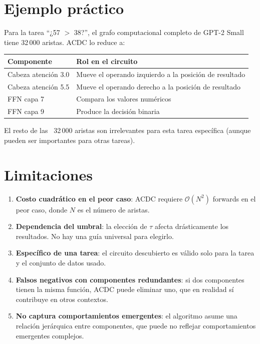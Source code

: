 \documentclass[11pt,a4paper]{report}
\theoremstyle{definition}
\begin{document}
\section{Ejemplo práctico}

Para la tarea ``¿57 $>$ 38?'', el grafo computacional completo de GPT-2 Small tiene 32\,000 aristas. ACDC lo reduce a:

\begin{center}
\begin{tabular}{ll}
\toprule
\textbf{Componente} & \textbf{Rol en el circuito} \\
\midrule
Cabeza atención 3.0 & Mueve el operando izquierdo a la posición de resultado \\
Cabeza atención 5.5 & Mueve el operando derecho a la posición de resultado \\
FFN capa 7 & Compara los valores numéricos \\
FFN capa 9 & Produce la decisión binaria \\
\bottomrule
\end{tabular}
\end{center}

El resto de las ~32\,000 aristas son irrelevantes para esta tarea específica (aunque pueden ser importantes para otras tareas).

\section{Limitaciones}

\begin{enumerate}
    \item \textbf{Costo cuadrático en el peor caso}: ACDC requiere $\mathcal{O}(N^2)$ forwards en el peor caso, donde $N$ es el número de aristas.
    \item \textbf{Dependencia del umbral}: la elección de $\tau$ afecta drásticamente los resultados. No hay una guía universal para elegirlo.
    \item \textbf{Específico de una tarea}: el circuito descubierto es válido solo para la tarea y el conjunto de datos usado.
    \item \textbf{Falsos negativos con componentes redundantes}: si dos componentes tienen la misma función, ACDC puede eliminar uno, que en realidad sí contribuye en otros contextos.
    \item \textbf{No captura comportamientos emergentes}: el algoritmo asume una relación jerárquica entre componentes, que puede no reflejar comportamientos emergentes complejos.
\end{enumerate}
\end{document}
